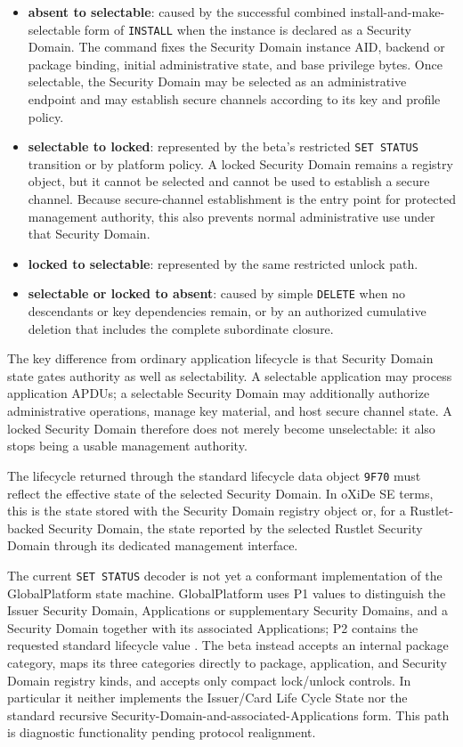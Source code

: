 \begin{itemize}
\item \textbf{absent to selectable}: caused by the successful combined
  install-and-make-selectable form of \texttt{INSTALL} when the instance is declared as a
  Security Domain. The command fixes the Security Domain instance AID, backend
  or package binding, initial administrative state, and base privilege bytes.
  Once selectable, the Security Domain may be selected as an administrative
  endpoint and may establish secure channels according to its key and profile
  policy.
\item \textbf{selectable to locked}: represented by the beta's restricted
  \texttt{SET STATUS} transition or by platform policy. A locked Security
  Domain remains a registry object, but it cannot be selected and cannot be
  used to establish a secure channel. Because secure-channel establishment is
  the entry point for protected management authority, this also prevents normal
  administrative use under that Security Domain.
\item \textbf{locked to selectable}: represented by the same restricted
  unlock path.
\item \textbf{selectable or locked to absent}: caused by simple
  \texttt{DELETE} when no descendants or key dependencies remain, or by an
  authorized cumulative deletion that includes the complete subordinate
  closure.
\end{itemize}

The key difference from ordinary application lifecycle is that Security Domain
state gates authority as well as selectability. A selectable application may
process application APDUs; a selectable Security Domain may additionally
authorize administrative operations, manage key material, and host secure
channel state. A locked Security Domain therefore does not merely become
unselectable: it also stops being a usable management authority.

The lifecycle returned through the standard lifecycle data object
\texttt{9F70} must reflect the effective state of the selected Security
Domain. In oXiDe SE terms, this is the state stored with the Security Domain
registry object or, for a Rustlet-backed Security Domain, the state reported by
the selected Rustlet Security Domain through its dedicated management
interface.

The current \texttt{SET STATUS} decoder is not yet a conformant implementation
of the GlobalPlatform state machine. GlobalPlatform uses P1 values to
distinguish the Issuer Security Domain, Applications or supplementary Security
Domains, and a Security Domain together with its associated Applications; P2
contains the requested standard lifecycle value
. The beta instead accepts an internal package category,
maps its three categories directly to package, application, and Security
Domain registry kinds, and accepts only compact lock/unlock controls. In
particular it neither implements the Issuer/Card Life Cycle State nor the
standard recursive Security-Domain-and-associated-Applications form. This path
is diagnostic functionality pending protocol realignment.


